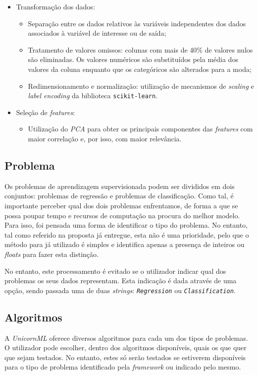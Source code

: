\documentclass[a4paper]{report}
\begin{document}
{		\begin{itemize}
			\item Transformação dos dados:
			\begin{itemize}
				\item Separação entre os dados relativos às variáveis independentes dos dados associados à variável de interesse ou de saída;
				\item Tratamento de valores omissos: colunas com mais de 40\% de valores nulos são eliminadas. Os valores numéricos são substituídos pela média dos valores da coluna enquanto que os categóricos são alterados para a moda;
				\item Redimensionamento e normalização: utilização de mecanismos de \textit{scaling} e \textit{label encoding} da biblioteca \texttt{scikit-learn}.
			\end{itemize}
			\item Seleção de \textit{features}:
			\begin{itemize}
				\item Utilização do \textit{PCA} para obter os principais componentes das \textit{features} com maior correlação e, por isso, com maior relevância.
			\end{itemize}
			
		\end{itemize}

		\subsection{Problema} \label{subsec:Problem}
		Os problemas de aprendizagem supervisionada podem ser divididos em dois conjuntos: problemas de regressão e problemas de classificação.
		Como tal, é importante perceber qual dos dois problemas enfrentamos, de forma a que se possa poupar tempo e recursos de computação na procura do melhor modelo.
		Para isso, foi pensada uma forma de identificar o tipo do problema. No entanto, tal como referido na proposta já entregue, esta não é uma prioridade,
		pelo que o método para já utilizado é simples e identifica apenas a presença de inteiros ou \textit{floats} para fazer esta distinção.

		No entanto, este processamento é evitado se o utilizador indicar qual dos problemas os seus dados representam.
		Esta indicação é dada através de uma opção, sendo passada uma de duas \textit{strings}: \textit{\texttt{Regression}} ou \textit{\texttt{Classification}}.

		\subsection{Algoritmos} \label{subsec:Algorithms}
		A \textsl{UnicornML} oferece diversos algoritmos para cada um dos tipos de problemas. 
		O utilizador pode escolher, dentro dos algoritmos disponíveis, quais os que quer que sejam testados. 
		No entanto, estes só serão testados se estiverem disponíveis para o tipo de problema identificado pela \textit{framework} ou indicado pelo mesmo.

}
\end{document}
